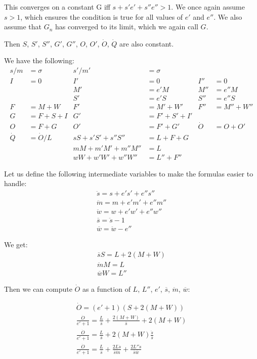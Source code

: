 \documentclass{article}
\begin{document}
This converges on a constant G iff $s+s'e'+s''e'' > 1$. We once again
assume $s > 1$, which ensures the condition is true for all values of
$e'$ and $e''$. We also assume that $G_n$ has converged to its limit,
which we again call $G$.

Then $S$, $S'$, $S''$, $G'$, $G''$, $O$, $O'$,
$\dot{O}$, $\dot{Q}$ are also constant.

We have the following:
\begin{align*}
s/m &= \sigma  &  s'/m' &= \sigma \\
I &= 0  &  I' &= 0  &  I'' &= 0  \\
 & & M' &= e'M  &  M'' &= e''M \\
 & & S' &= e'S  &  S'' &= e''S \\
F &= M + W  &  F' &= M' + W'  &  F'' &= M'' + W'' \\
G &= F + S + I  &  G' &= F' + S' + I' \\
O &= F + G  &  O' &= F' + G' & \dot{O} &= O + O' \\
\dot{Q} &= \dot{O}/L  & sS + s'S' + s''S'' &= L + F + G \\
             &         &  mM + m'M' + m''M'' &= L \\
             &         &  wW + w'W' + w''W'' &= L'' + F''
\end{align*}

Let us define the following intermediate variables to make the
formulas easier to handle:
\begin{gather}
\ddot{s} = s + e's' + e''s'' \\
\ddot{m} = m + e'm' + e''m'' \\
\ddot{w} = w + e'w' + e''w'' \\
\overline{s} = \ddot{s} - 1 \\
\overline{w} = \ddot{w} - e''
\end{gather}

We get:
\begin{gather}
\overline{s} S = L + 2(M + W) \\
\ddot{m}M = L \\
\overline{w}W = L''
\end{gather}

Then we can compute $\dot{O}$ as a function of $L$, $L''$, $e'$,
$\overline{s}$, $\ddot{m}$, $\overline{w}$:

\begin{gather}
\dot{O} = (e'+1)(S + 2(M+W)) \\
\frac{\dot{O}}{e'+1}
 = \frac{L}{\overline{s}} + \frac{2(M+W)}{\overline{s}} + 2(M+W) \\
\frac{\dot{O}}{e'+1}
 = \frac{L}{\overline{s}} + 2(M+W)\frac{\ddot{s}}{\overline{s}} \\
\frac{\dot{O}}{e'+1}
 = \frac{L}{\overline{s}} + \frac{2L\ddot{s}}{\overline{s}\ddot{m}}
     + \frac{2L''\ddot{s}}{\overline{s}\overline{w}}
\end{gather}
\end{document}
